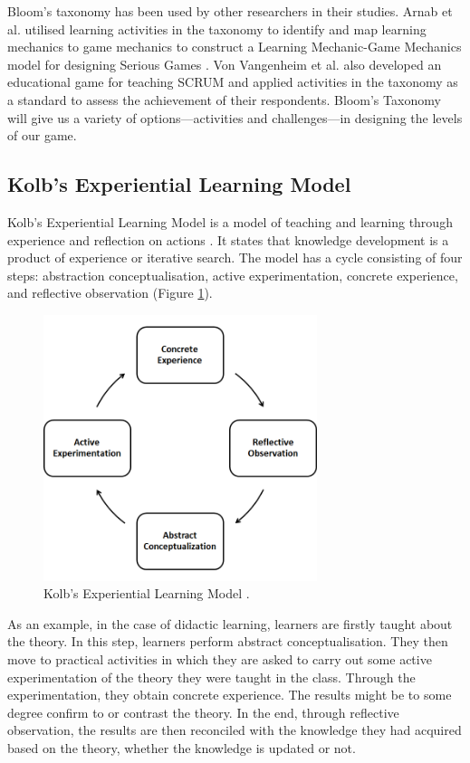 \documentclass[12pt, a4paper]{report}
\begin{document}
Bloom's taxonomy has been used by other researchers in their studies. Arnab et al. utilised learning activities in the taxonomy to identify and map learning mechanics to game mechanics to construct a Learning Mechanic-Game Mechanics model for designing Serious Games \cite{arnab2015mapping}. Von Vangenheim et al. \cite{von2013scrumia} also developed an educational game for teaching SCRUM and applied activities in the taxonomy as a standard to assess the achievement of their respondents. Bloom's Taxonomy will give us a variety of options---activities and challenges---in designing the levels of our game.

\subsection{Kolb's Experiential Learning Model}
Kolb's Experiential Learning Model is a model of teaching and learning through experience and reflection on actions \cite{kolb2014experiential}. It states that knowledge development is a product of experience or iterative search. The model has a cycle consisting of four steps: abstraction conceptualisation, active experimentation, concrete experience, and reflective observation (Figure \ref{kolb}). 

\begin{figure}[ht]
\centering
\includegraphics[width=8cm]{kolb}
\caption{Kolb's Experiential Learning Model \cite{kolb2014experiential}.}
\label{kolb}
\end{figure}

As an example, in the case of didactic learning, learners are firstly taught about the theory. In this step, learners perform abstract conceptualisation. They then move to practical activities in which they are asked to carry out some active experimentation of the theory they were taught in the class. Through the experimentation, they obtain concrete experience. The results might be to some degree confirm to or contrast the theory. In the end, through reflective observation, the results are then reconciled with the knowledge they had acquired based on the theory, whether the knowledge is updated or not. 
\end{document}
